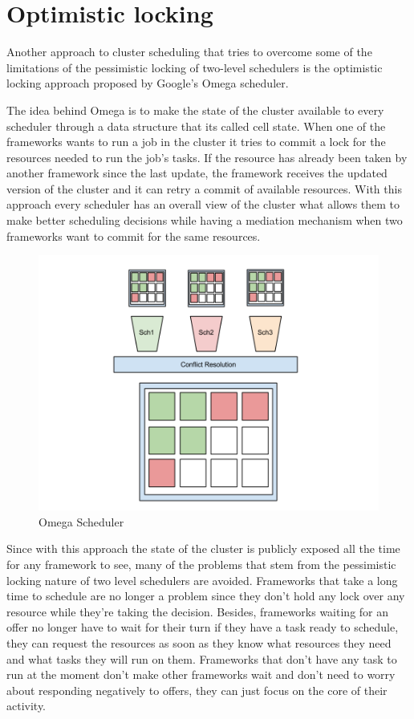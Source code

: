 \documentclass{report}                     %
\begin{document}
\chapter{Optimistic locking}

\label{sec:omega}

Another approach to cluster scheduling that tries to overcome some of
the limitations of the pessimistic locking of two-level schedulers is
the optimistic locking approach proposed by Google's Omega
scheduler.

The idea behind Omega is to make the state of the cluster available to
every scheduler through a data structure that its called cell
state. When one of the frameworks wants to run a job in the cluster it
tries to commit a lock for the resources needed to run the job's
tasks. If the resource has already been taken by another framework
since the last update, the framework receives the updated version of
the cluster and it can retry a commit of available resources. With
this approach every scheduler has an overall view of the cluster what
allows them to make better scheduling decisions while having a
mediation mechanism when two frameworks want to commit for the same 
resources.

\begin{figure}[!ht]
  \centering
  \includegraphics[scale=0.25,natwidth=960,natheight=720]{Omega.png}
  \caption{Omega Scheduler}
  \label{fig:omega}
\end{figure}

Since with this approach the state of the cluster is publicly exposed all the
time for any framework to see, many of the problems that stem from the 
pessimistic locking nature of two level schedulers are avoided.  Frameworks
that take a long time to schedule are no longer a problem since they don't
hold any lock over any resource while they're taking the decision. Besides,
frameworks waiting for an offer no longer have to wait for their turn if they
have a task ready to schedule, they can request the resources as soon as they
know what resources they need and what tasks they will run on them. Frameworks
that don't have any task to run at the moment don't make other frameworks wait
and don't need to worry about responding negatively to offers, they can just
focus on the core of their activity.
\end{document}

